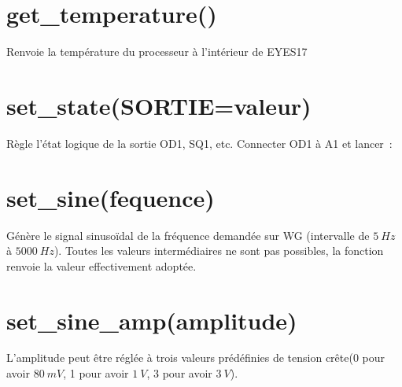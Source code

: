 \documentclass[a4paper,12pt,french]{sphinxmanual}
\begin{document}
\section{get\_temperature()}
\label{\detokenize{9.0:get-temperature}}
Renvoie la température du processeur à l’intérieur de EYES17

\begin{sphinxVerbatim}[commandchars=\\\{\}]
 
\end{sphinxVerbatim}


\section{set\_state(SORTIE=valeur)}
\label{\detokenize{9.0:set-state-sortie-valeur}}
Règle l’état logique de la sortie OD1, SQ1, etc. Connecter OD1 à A1
et lancer :

\begin{sphinxVerbatim}[commandchars=\\\{\}]
 
\end{sphinxVerbatim}


\section{set\_sine(fequence)}
\label{\detokenize{9.0:set-sine-fequence}}
Génère le signal sinusoïdal de la fréquence demandée sur WG (intervalle
de \(5~Hz\) à \(5000~Hz\)). Toutes les valeurs intermédiaires ne sont
pas possibles, la fonction renvoie la valeur effectivement adoptée.

\begin{sphinxVerbatim}[commandchars=\\\{\}]
 
\end{sphinxVerbatim}



\section{set\_sine\_amp(amplitude)}
\label{\detokenize{9.0:set-sine-amp-amplitude}}
L’amplitude peut être réglée à trois valeurs prédéfinies de tension
crête(0 pour avoir \(80~mV\), 1 pour avoir \(1~V\), 3 pour avoir \(3~V\)).
\end{document}
